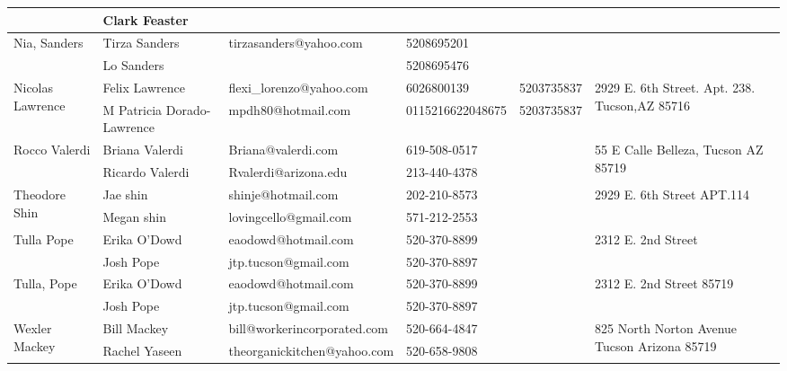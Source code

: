 \documentclass[landscape]{article}\usepackage[]{graphicx}\usepackage[]{color}
\begin{document}
\begin{longtable}{|p{100pt}|p{100pt}|p{140pt}|p{60pt}|p{64pt}|p{120pt}|}
 & Clark Feaster &  &  &  & \\
\hline
\multirow{2}{100pt}{Nia, Sanders} & Tirza Sanders & tirzasanders@yahoo.com & 5208695201 &  & \multirow{2}{120pt}{} \\
 & Lo Sanders &  & 5208695476 &  & \\
\hline
\multirow{2}{100pt}{Nicolas Lawrence} & Felix Lawrence & flexi\_lorenzo@yahoo.com & 6026800139 & 5203735837 & \multirow{2}{120pt}{2929 E. 6th Street. Apt. 238. Tucson,AZ 85716} \\
 & M Patricia Dorado-Lawrence & mpdh80@hotmail.com & 0115216622048675 & 5203735837 & \\
\hline
\multirow{2}{100pt}{Rocco Valerdi } & Briana Valerdi & Briana@valerdi.com & 619-508-0517 &  & \multirow{2}{120pt}{55 E Calle Belleza, Tucson AZ 85719} \\
 & Ricardo Valerdi & Rvalerdi@arizona.edu & 213-440-4378 &  & \\
\hline
\multirow{2}{100pt}{Theodore Shin} & Jae shin & shinje@hotmail.com & 202-210-8573 &  & \multirow{2}{120pt}{2929 E. 6th Street APT.114} \\
 & Megan shin & lovingcello@gmail.com & 571-212-2553 &  & \\
\hline
\multirow{2}{100pt}{Tulla Pope} & Erika O'Dowd & eaodowd@hotmail.com & 520-370-8899 &  & \multirow{2}{120pt}{2312 E. 2nd Street} \\
 & Josh Pope & jtp.tucson@gmail.com & 520-370-8897 &  & \\
\hline
\multirow{2}{100pt}{Tulla, Pope} & Erika O'Dowd & eaodowd@hotmail.com & 520-370-8899 &  & \multirow{2}{120pt}{2312 E. 2nd Street 85719} \\
 & Josh Pope & jtp.tucson@gmail.com & 520-370-8897 &  & \\
\hline
\multirow{2}{100pt}{Wexler Mackey} & Bill Mackey & bill@workerincorporated.com & 520-664-4847 &  & \multirow{2}{120pt}{825 North Norton Avenue Tucson Arizona 85719} \\
 & Rachel Yaseen & theorganickitchen@yahoo.com & 520-658-9808 &  & \\
\hline
\end{longtable}
\newpage
\end{document}
